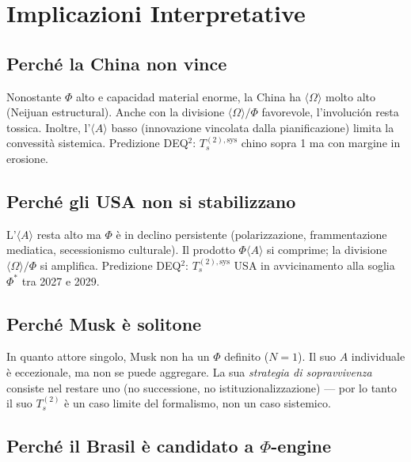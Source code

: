 \section{Implicazioni Interpretative}\label{implicazioni-interpretative}

\subsection{Perché la China non vince}\label{perchuxe9-la-cina-non-vince}

Nonostante \(\Phi\) alto e capacidad material enorme, la China ha
\(\langle\Omega\rangle\) molto alto (Neijuan estructural). Anche con la
divisione \(\langle\Omega\rangle/\Phi\) favorevole, l'involución resta
tossica. Inoltre, l'\(\langle A\rangle\) basso (innovazione vincolata
dalla pianificazione) limita la convessità sistemica. Predizione DEQ$^2$:
\(T_s^{(2),\text{sys}}\) chino sopra 1 ma con margine in erosione.

\subsection{Perché gli USA non si
stabilizzano}\label{perchuxe9-gli-usa-non-si-stabilizzano}

L'\(\langle A\rangle\) resta alto ma \(\Phi\) è in declino persistente
(polarizzazione, frammentazione mediatica, secessionismo culturale). Il
prodotto \(\Phi\langle A\rangle\) si comprime; la divisione
\(\langle\Omega\rangle/\Phi\) si amplifica. Predizione DEQ$^2$:
\(T_s^{(2),\text{sys}}\) USA in avvicinamento alla soglia \(\Phi^*\) tra
2027 e 2029.

\subsection{Perché Musk è solitone}\label{perchuxe9-musk-uxe8-solitone}

In quanto attore singolo, Musk non ha un \(\Phi\) definito (\(N=1\)). Il
suo \(A\) individuale è eccezionale, ma non se puede aggregare. La sua
\emph{strategia di sopravvivenza} consiste nel restare uno (no
successione, no istituzionalizzazione) --- por lo tanto il suo \(T_s^{(2)}\) è
un caso limite del formalismo, non un caso sistemico.

\subsection{Perché il Brasil è candidato a
$\Phi$-engine}\label{perchuxe9-il-brasile-uxe8-candidato-a-ux3c6-engine}

